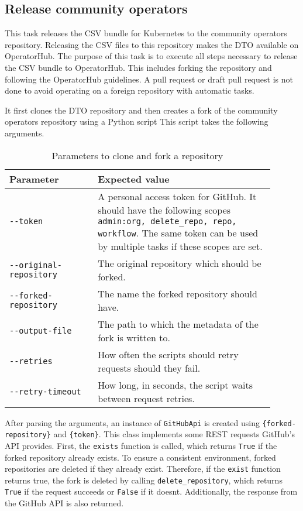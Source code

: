 \subsection{Release community operators}\label{subsec:release-community-operators}

This task releases the CSV bundle for Kubernetes to the community operators repository.
Releasing the CSV files to this repository makes the DTO available on OperatorHub.
The purpose of this task is to execute all steps necessary to release the CSV bundle to OperatorHub.
This includes forking the repository and following the OperatorHub guidelines.
A pull request or draft pull request is not done to avoid operating on a foreign repository with automatic tasks.

It first clones the DTO repository and then creates a fork of the community operators repository using a Python script
This script takes the following arguments.

\begin{table}[H]
    \centering
    \caption{Parameters to clone and fork a repository}
    \label{tab:parameters-to-clone-and-fork-a-repository}
    \begin{tabular}{p{0.3\linewidth}|p{0.6\linewidth}}
        Parameter & Expected value \\
        \hline
        \verb|--token| & A personal access token for GitHub.
            It should have the following scopes \verb|admin:org, delete_repo, repo, workflow|.
            The same token can be used by multiple tasks if these scopes are set. \\
        \verb|--original-repository| & The original repository which should be forked. \\
        \verb|--forked-repository| & The name the forked repository should have. \\
        \verb|--output-file| & The path to which the metadata of the fork is written to. \\
        \verb|--retries| & How often the scripts should retry requests should they fail. \\
        \verb|--retry-timeout| & How long, in seconds, the script waits between request retries. \\
    \end{tabular}
\end{table}

After parsing the arguments, an instance of \verb|GitHubApi| is created using \verb|{forked-repository}| and \verb|{token}|.
This class implements some REST requests GitHub's API provides.
First, the \verb|exists| function is called, which returns \verb|True| if the forked repository already exists.
To ensure a consistent environment, forked repositories are deleted if they already exist.
Therefore, if the \verb|exist| function returns true, the fork is deleted by calling \verb|delete_repository|, which returns \verb|True| if the request succeeds or \verb|False| if it doesnt.
Additionally, the response from the GitHub API is also returned.

